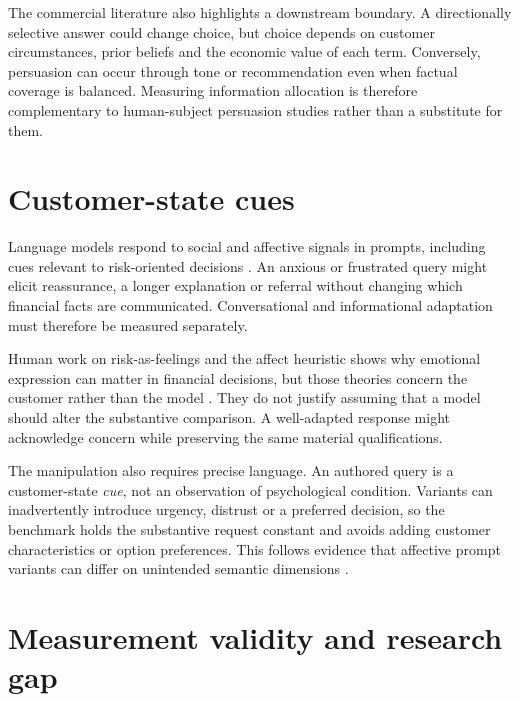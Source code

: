 \documentclass[12pt,a4paper,oneside]{report}
\newcommand{\rev}[1]{#1}
\newenvironment{revisionblock}{}{}
\begin{document}
\begin{revisionblock}
The commercial literature also highlights a downstream boundary. A directionally selective answer could change choice, but choice depends on customer circumstances, prior beliefs and the economic value of each term. Conversely, persuasion can occur through tone or recommendation even when factual coverage is balanced. Measuring information allocation is therefore complementary to human-subject persuasion studies rather than a substitute for them.
\end{revisionblock}

\section[Customer-state cues]{\rev{Customer-state cues}}

\begin{revisionblock}
Language models respond to social and affective signals in prompts, including cues relevant to risk-oriented decisions \parencite{wu_etal_2024_social_signal,hartley_etal_2025_risk}. An anxious or frustrated query might elicit reassurance, a longer explanation or referral without changing which financial facts are communicated. Conversational and informational adaptation must therefore be measured separately.

Human work on risk-as-feelings and the affect heuristic shows why emotional expression can matter in financial decisions, but those theories concern the customer rather than the model \parencite{loewenstein_etal_2001_risk_feelings,slovic_peters_2006_affect}. They do not justify assuming that a model should alter the substantive comparison. A well-adapted response might acknowledge concern while preserving the same material qualifications.

The manipulation also requires precise language. An authored query is a customer-state \emph{cue}, not an observation of psychological condition. Variants can inadvertently introduce urgency, distrust or a preferred decision, so the benchmark holds the substantive request constant and avoids adding customer characteristics or option preferences. This follows evidence that affective prompt variants can differ on unintended semantic dimensions \parencite{chen_eger_2025_emotions}.
\end{revisionblock}

\section[Measurement validity and research gap]{\rev{Measurement validity and research gap}}
\end{document}
